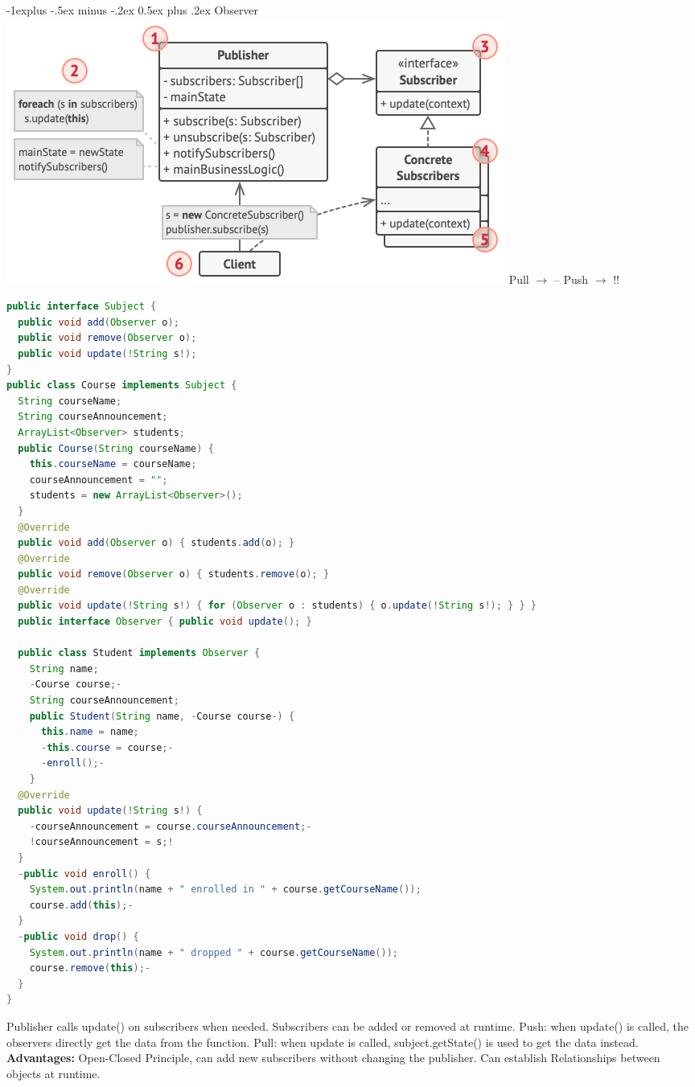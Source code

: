 \documentclass[letterpaper, 8pt]{extarticle}
\makeatletter
\renewcommand{\subsection}{\@startsection{subsection}{2}{0mm}%
                                {-1explus -.5ex minus -.2ex}%
                                {0.5ex plus .2ex}%
                                {\normalfont\small\bfseries}}
\makeatother
\begin{document}
\begin{multicols*}{5}
  \subsection{Observer}
  \includegraphics[width=\linewidth]{observer.png}
  Pull $\rightarrow$ --
  Push $\rightarrow$ !!
  \begin{lstlisting}[language=Java, breaklines=true]
public interface Subject {
  public void add(Observer o);
  public void remove(Observer o);
  public void update(!String s!);
}
public class Course implements Subject {
  String courseName;
  String courseAnnouncement;
  ArrayList<Observer> students;
  public Course(String courseName) {
    this.courseName = courseName;
    courseAnnouncement = "";
    students = new ArrayList<Observer>();
  }
  @Override
  public void add(Observer o) { students.add(o); }
  @Override
  public void remove(Observer o) { students.remove(o); }
  @Override
  public void update(!String s!) { for (Observer o : students) { o.update(!String s!); } } }
  public interface Observer { public void update(); }
  
  public class Student implements Observer {
    String name;
    -Course course;-
    String courseAnnouncement;
    public Student(String name, -Course course-) {
      this.name = name;
      -this.course = course;-
      -enroll();-
    }
  @Override
  public void update(!String s!) {
    -courseAnnouncement = course.courseAnnouncement;-
    !courseAnnouncement = s;!
  }
  -public void enroll() {
    System.out.println(name + " enrolled in " + course.getCourseName());
    course.add(this);-
  }
  -public void drop() {
    System.out.println(name + " dropped " + course.getCourseName());
    course.remove(this);-
  }
}
  \end{lstlisting}
  Publisher calls update() on subscribers when needed. Subscribers can be added or removed at runtime. Push: when update() is called, the observers directly get the data from the function. Pull: when update is called, subject.getState() is used to get the data instead.
  \textbf{Advantages:} Open-Closed Principle, can add new subscribers without changing the publisher.
  Can establish Relationships between objects at runtime.


\end{multicols*}
\end{document}
